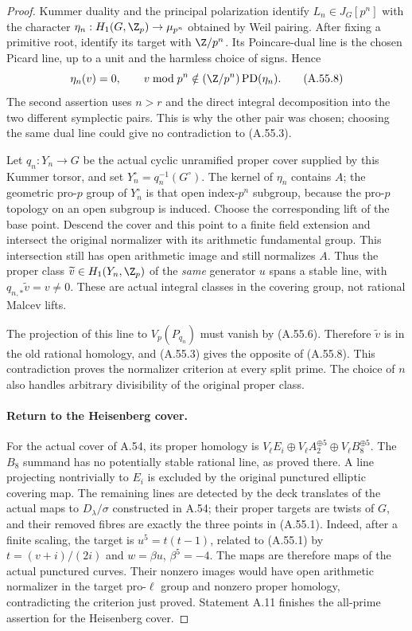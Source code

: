 \begin{proof}
Kummer duality and the principal polarization identify
\(L_n\in J_G[p^n]\) with the character
\(\eta_n:H_1(G,\Z_p)\to\mu_{p^n}\) obtained by Weil pairing.
After fixing a primitive root, identify its target with
\(\Z/p^n\). Its Poincare-dual line is the chosen Picard
line, up to a unit and the harmless choice of signs. Hence
\[
       \eta_n(v)=0,
       \qquad
       v\bmod p^n\notin
          (\Z/p^n)\operatorname{PD}(\eta_n).          \tag{A.55.8}
\]
The second assertion uses \(n>r\) and the direct integral
decomposition into the two different symplectic pairs. This
is why the other pair was chosen; choosing the same dual line
could give no contradiction to (A.55.3).

Let \(q_n:Y_n\to G\) be the actual cyclic unramified proper
cover supplied by this Kummer torsor, and set
\(Y_n^\circ=q_n^{-1}(G^\circ)\). The kernel of \(\eta_n\)
contains \(A\); the geometric pro-\(p\) group of
\(Y_n^\circ\) is that open index-\(p^n\) subgroup, because
the pro-\(p\) topology on an open subgroup is induced.
Choose the corresponding lift of the base point. Descend the
cover and this point to a finite field extension and intersect
the original normalizer with its arithmetic fundamental group.
This intersection still has open arithmetic image and still
normalizes \(A\). Thus the proper class
\(\widetilde v\in H_1(Y_n,\Z_p)\) of the \emph{same}
generator \(u\) spans a stable line, with
\(q_{n,*}\widetilde v=v\ne0\). These are actual integral
classes in the covering group, not rational Malcev lifts.

The projection of this line to \(V_p(P_{q_n})\) must vanish
by (A.55.6). Therefore \(\widetilde v\) is in the old rational
homology, and (A.55.3) gives the opposite of (A.55.8).
This contradiction proves the normalizer criterion at every
split prime. The choice of \(n\) also handles arbitrary
divisibility of the original proper class.

\paragraph{Return to the Heisenberg cover.}
For the actual cover of A.54, its proper homology is
\(V_\ell E_i\oplus V_\ell A_2^{\oplus5}
\oplus V_\ell B_8^{\oplus5}\).
The \(B_8\) summand has no potentially stable rational line,
as proved there. A line projecting nontrivially to \(E_i\)
is excluded by the original punctured elliptic covering map.
The remaining lines are detected by the deck translates of
the actual maps to \(D_\lambda/\sigma\) constructed in A.54;
their proper targets are twists of \(G\), and their removed
fibres are exactly the three points in (A.55.1).
Indeed, after a finite scaling, the target is
\(u^5=t(t-1)\), related to (A.55.1) by
\(t=(v+i)/(2i)\) and \(w=\beta u\), \(\beta^5=-4\).
The maps are therefore maps of the actual punctured curves.
Their nonzero images would have open arithmetic normalizer
in the target pro-\(\ell\) group and nonzero proper homology,
contradicting the criterion just proved. Statement A.11
finishes the all-prime assertion for the Heisenberg cover.


\end{proof}
